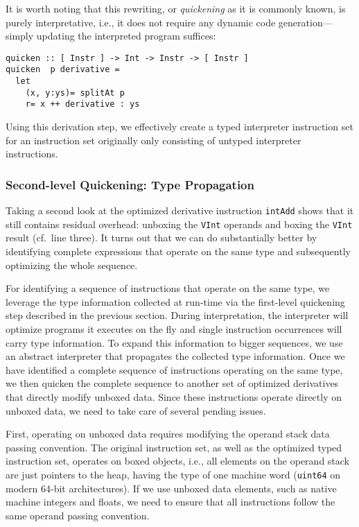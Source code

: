 \documentclass[preprint,10pt]{popl14conf}
\begin{document}
It is worth noting that this rewriting, or \emph{quickening} as it is commonly known, is purely
interpretative, i.e., it does not require any dynamic code generation---simply updating the
interpreted program suffices:

\begin{lstlisting}[style=prettyhaskell]
quicken :: [ Instr ] -> Int -> Instr -> [ Instr ]
quicken  p derivative =
  let
    (x, y:ys)= splitAt p 
    r= x ++ derivative : ys
\end{lstlisting}

Using this derivation step, we effectively create a typed interpreter instruction set for an
instruction set originally only consisting of untyped interpreter instructions.


\subsubsection{Second-level Quickening: Type Propagation}

Taking a second look at the optimized derivative instruction \texttt{intAdd} shows that it still
contains residual overhead: unboxing the \texttt{VInt} operands and boxing the \texttt{VInt} result
(cf.~line three).
It turns out that we can do substantially better by identifying complete expressions that operate on
the same type and subsequently optimizing the whole sequence.

For identifying a sequence of instructions that operate on the same type, we leverage the type
information collected at run-time via the first-level quickening step described in the previous
section.
During interpretation, the interpreter will optimize programs it executes on the fly and single
instruction occurrences will carry type information.
To expand this information to bigger sequences, we use an abstract interpreter that propagates
the collected type information.
Once we have identified a complete sequence of instructions operating on the same type, we then
quicken the complete sequence to another set of optimized derivatives that directly modify unboxed
data.
Since these instructions operate directly on unboxed data, we need to take care of several pending
issues.

First, operating on unboxed data requires modifying the operand stack data passing convention.
The original instruction set, as well as the optimized typed instruction set, operates on boxed
objects, i.e., all elements on the operand stack are just pointers to the heap, having the type of
one machine word (\texttt{uint64} on modern 64-bit architectures).
If we use unboxed data elements, such as native machine integers and floats, we need to ensure that
all instructions follow the same operand passing convention.
\end{document}
